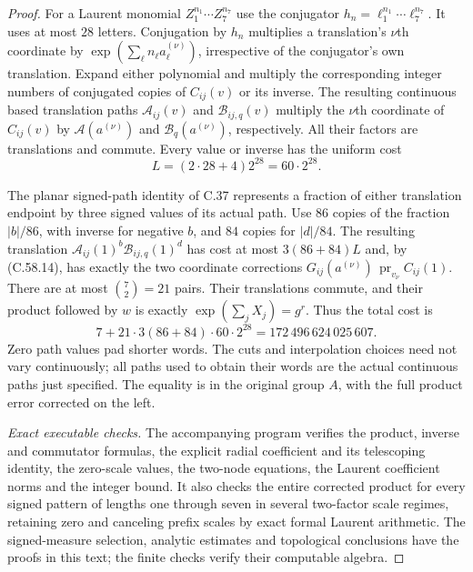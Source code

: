 \begin{proof}
For a Laurent monomial $Z_1^{n_1}\cdots Z_7^{n_7}$ use
the conjugator $h_n=\ell_1^{n_1}\cdots\ell_7^{n_7}$.
It uses at most $28$ letters.
Conjugation by $h_n$ multiplies a translation's
$\nu$th coordinate by
$\exp(\sum_\ell n_\ell a_\ell^{(\nu)})$, irrespective
of the conjugator's own translation.
Expand either polynomial and multiply the corresponding
integer numbers of conjugated copies of $C_{ij}(v)$
or its inverse.
The resulting continuous based translation paths
$\mathcal A_{ij}(v)$ and $\mathcal B_{ij,q}(v)$
multiply the $\nu$th coordinate of $C_{ij}(v)$ by
$\mathcal A(a^{(\nu)})$ and
$\mathcal B_q(a^{(\nu)})$, respectively.
All their factors are translations and commute.
Every value or inverse has the uniform cost
\[
                     L=(2\cdot28+4)2^{28}=60\cdot2^{28}.
                                                               \tag{C.58.16}
\]

The planar signed-path identity of C.37 represents a
fraction of either translation endpoint by three signed
values of its actual path.
Use $86$ copies of the fraction $|b|/86$, with inverse
for negative $b$, and $84$ copies for $|d|/84$.
The resulting translation
$\mathcal A_{ij}(1)^b\mathcal B_{ij,q}(1)^d$ has cost
at most $3(86+84)L$ and, by (C.58.14), has exactly the
two coordinate corrections
$G_{ij}(a^{(\nu)})\,\operatorname{pr}_{v_\nu}C_{ij}(1)$.
There are at most $\binom72=21$ pairs.
Their translations commute, and their product followed
by $w$ is exactly $\exp(\sum_jX_j)=g^r$.
Thus the total cost is
\[
 7+21\cdot3(86+84)\cdot60\cdot2^{28}
                         =172\,496\,624\,025\,607.      \tag{C.58.17}
\]
Zero path values pad shorter words.
The cuts and interpolation choices need not vary
continuously; all paths used to obtain their words are
the actual continuous paths just specified.
The equality is in the original group $A$, with the
full product error corrected on the left.

\emph{Exact executable checks.}
The accompanying program
verifies the product, inverse and commutator formulas,
the explicit radial coefficient and its telescoping
identity, the zero-scale values, the two-node equations,
the Laurent coefficient norms and the integer bound.
It also checks the entire corrected product for every
signed pattern of lengths one through seven in several
two-factor scale regimes, retaining zero and canceling
prefix scales by exact formal Laurent arithmetic.
The signed-measure selection, analytic estimates and
topological conclusions have the proofs in this text;
the finite checks verify their computable algebra.


\end{proof}
